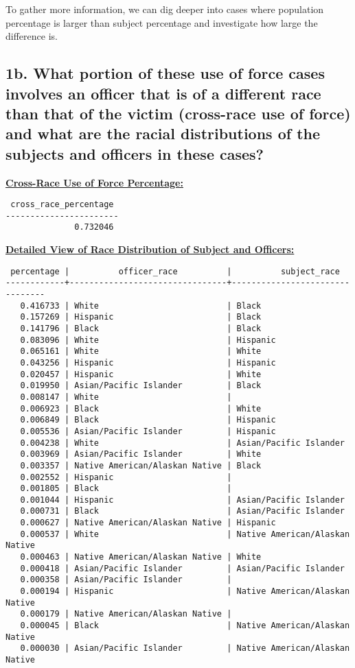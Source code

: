 \documentclass[10pt]{article}
\begin{document}
To gather more information, we can dig deeper into cases where population percentage is larger than subject percentage and investigate how large the difference is.


\subsection*{1b. What portion of these use of force cases involves an officer that is of a different race than that of the victim (cross-race use of force) and what are the racial distributions of the subjects and officers in these cases?}

\underline{\textbf{Cross-Race Use of Force Percentage:}}
\begin{verbatim}
 cross_race_percentage
-----------------------
              0.732046
\end{verbatim}

\underline{\textbf{Detailed View of Race Distribution of Subject and Officers:}}
\begin{verbatim}
 percentage |          officer_race          |          subject_race
------------+--------------------------------+--------------------------------
   0.416733 | White                          | Black
   0.157269 | Hispanic                       | Black
   0.141796 | Black                          | Black
   0.083096 | White                          | Hispanic
   0.065161 | White                          | White
   0.043256 | Hispanic                       | Hispanic
   0.020457 | Hispanic                       | White
   0.019950 | Asian/Pacific Islander         | Black
   0.008147 | White                          |
   0.006923 | Black                          | White
   0.006849 | Black                          | Hispanic
   0.005536 | Asian/Pacific Islander         | Hispanic
   0.004238 | White                          | Asian/Pacific Islander
   0.003969 | Asian/Pacific Islander         | White
   0.003357 | Native American/Alaskan Native | Black
   0.002552 | Hispanic                       |
   0.001805 | Black                          |
   0.001044 | Hispanic                       | Asian/Pacific Islander
   0.000731 | Black                          | Asian/Pacific Islander
   0.000627 | Native American/Alaskan Native | Hispanic
   0.000537 | White                          | Native American/Alaskan Native
   0.000463 | Native American/Alaskan Native | White
   0.000418 | Asian/Pacific Islander         | Asian/Pacific Islander
   0.000358 | Asian/Pacific Islander         |
   0.000194 | Hispanic                       | Native American/Alaskan Native
   0.000179 | Native American/Alaskan Native |
   0.000045 | Black                          | Native American/Alaskan Native
   0.000030 | Asian/Pacific Islander         | Native American/Alaskan Native
\end{verbatim}
\end{document}
